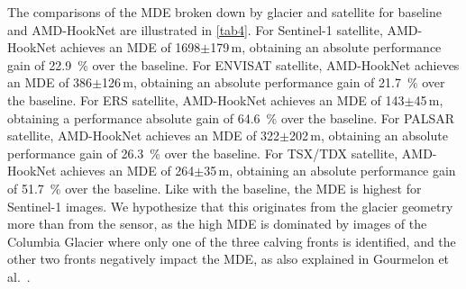 \documentclass[lettersize,journal,siunitx]{IEEEtran}
\begin{document}
The comparisons of the MDE broken down by glacier and satellite for baseline and AMD-HookNet are illustrated in \cref{tab4}. For Sentinel-1 satellite, AMD-HookNet achieves an MDE of 1698$\pm$179\,m, obtaining an absolute performance gain of \SI{22.9}{\percent} over the baseline. For ENVISAT satellite, AMD-HookNet achieves an MDE of 386$\pm$126\,m, obtaining an absolute performance gain of \SI{21.7}{\percent} over the baseline. For ERS satellite, AMD-HookNet achieves an MDE of 143$\pm$45\,m, obtaining a performance absolute gain of \SI{64.6}{\percent} over the baseline. For PALSAR satellite, AMD-HookNet achieves an MDE of 322$\pm$202\,m, obtaining an absolute performance gain of \SI{26.3}{\percent} over the baseline. For TSX/TDX satellite, AMD-HookNet achieves an MDE of 264$\pm$35\,m, obtaining an absolute performance gain of \SI{51.7}{\percent} over the baseline. Like with the baseline, the MDE is highest for Sentinel-1 images. We hypothesize that this originates from the glacier geometry more than from the sensor, as the high MDE is dominated by images of the Columbia Glacier where only one of the three calving fronts is identified, and the other two fronts negatively impact the MDE, as also explained in Gourmelon et al.~\cite{essd-14-4287-2022}.
\end{document}
